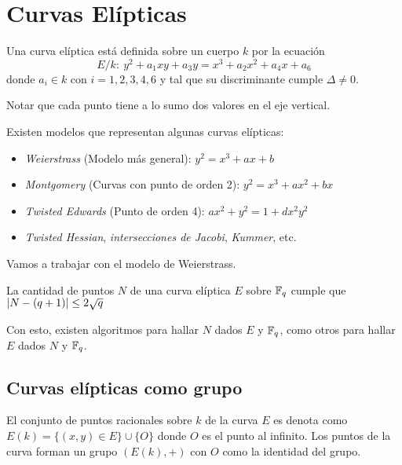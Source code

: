   \section{Curvas Elípticas}
  \begin{definition}
    Una curva elíptica está definida sobre un cuerpo $k$ por la ecuación
    \begin{equation*}
      E/k:\ y^2 + a_1xy + a_3y = x^3 + a_2x^2 + a_4x + a_6
    \end{equation*}
    donde $a_i \in k$ con $i=1,2,3,4,6$ y tal que su discriminante cumple $\Delta\neq 0$.
  \end{definition}
  \begin{remark}
    Notar que cada punto tiene a lo sumo dos valores en el eje vertical.
  \end{remark}
  
  Existen modelos que representan algunas curvas elípticas:
  \begin{itemize}
    \item \textit{Weierstrass} (Modelo más general): $y^2 = x^3 + ax + b$
    \item \textit{Montgomery} (Curvas con punto de orden 2): $y^2 = x^3 + ax^2 + bx$
    \item \textit{Twisted Edwards} (Punto de orden 4): $ax^2 + y^2 = 1 + dx^2y^2$
    \item \textit{Twisted Hessian}, \textit{intersecciones de Jacobi}, \textit{Kummer}, etc.
  \end{itemize}
  Vamos a trabajar con el modelo de Weierstrass.
  \begin{theorem}
    La cantidad de puntos $N$ de una curva elíptica $E$ sobre $\mathbb{F}_q$ cumple que $\left| N-(q+1) \right|\leq 2\sqrt{q}$
  \end{theorem}
  \begin{remark}
    Con esto, existen algoritmos para hallar $N$ dados $E$ y $\mathbb{F}_q$, como otros para hallar 
    $E$ dados $N$ y $\mathbb{F}_q$.
  \end{remark}

  \subsection{Curvas elípticas como grupo}
  \begin{definition}
    El conjunto de puntos racionales sobre $k$ de la curva $E$ es denota como $E(k) = \{(x,y) \in E\} \cup \{O\}$ 
    donde $O$ es el punto al infinito.
    Los puntos de la curva forman un grupo $(E(k), +)$ con $O$ como la identidad del grupo.
  \end{definition}

